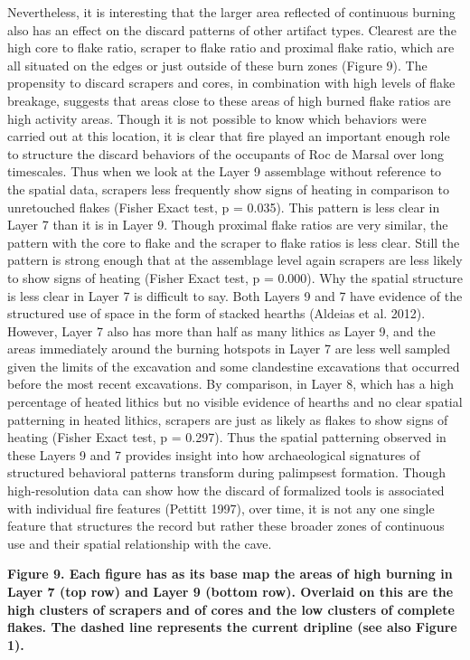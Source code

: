 \documentclass[smallextended]{svjour3}       %
\begin{document}
Nevertheless, it is interesting that the larger area reflected of
continuous burning also has an effect on the discard patterns of other
artifact types. Clearest are the high core to flake ratio, scraper to
flake ratio and proximal flake ratio, which are all situated on the
edges or just outside of these burn zones (Figure 9). The propensity to
discard scrapers and cores, in combination with high levels of flake
breakage, suggests that areas close to these areas of high burned flake
ratios are high activity areas. Though it is not possible to know which
behaviors were carried out at this location, it is clear that fire
played an important enough role to structure the discard behaviors of
the occupants of Roc de Marsal over long timescales. Thus when we look
at the Layer 9 assemblage without reference to the spatial data,
scrapers less frequently show signs of heating in comparison to
unretouched flakes (Fisher Exact test, p = 0.035). This pattern is less
clear in Layer 7 than it is in Layer 9. Though proximal flake ratios are
very similar, the pattern with the core to flake and the scraper to
flake ratios is less clear. Still the pattern is strong enough that at
the assemblage level again scrapers are less likely to show signs of
heating (Fisher Exact test, p = 0.000). Why the spatial structure is
less clear in Layer 7 is difficult to say. Both Layers 9 and 7 have
evidence of the structured use of space in the form of stacked hearths
(Aldeias et al. 2012). However, Layer 7 also has more than half as many
lithics as Layer 9, and the areas immediately around the burning
hotspots in Layer 7 are less well sampled given the limits of the
excavation and some clandestine excavations that occurred before the
most recent excavations. By comparison, in Layer 8, which has a high
percentage of heated lithics but no visible evidence of hearths and no
clear spatial patterning in heated lithics, scrapers are just as likely
as flakes to show signs of heating (Fisher Exact test, p = 0.297). Thus
the spatial patterning observed in these Layers 9 and 7 provides insight
into how archaeological signatures of structured behavioral patterns
transform during palimpsest formation. Though high-resolution data can
show how the discard of formalized tools is associated with individual
fire features (Pettitt 1997), over time, it is not any one single
feature that structures the record but rather these broader zones of
continuous use and their spatial relationship with the cave.

\textbf{Figure 9. Each figure has as its base map the areas of high
burning in Layer 7 (top row) and Layer 9 (bottom row). Overlaid on this
are the high clusters of scrapers and of cores and the low clusters of
complete flakes. The dashed line represents the current dripline (see
also Figure 1).}
\end{document}
